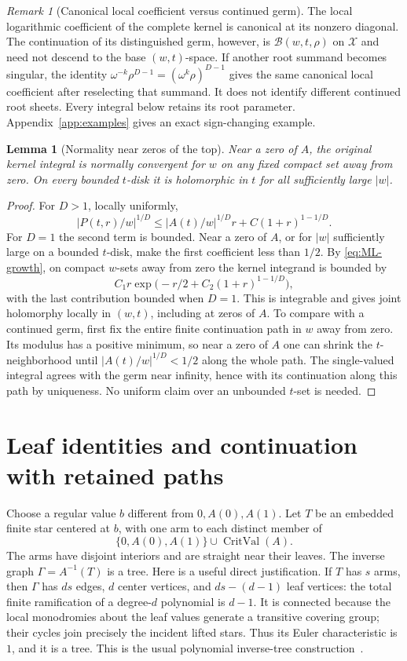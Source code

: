\documentclass[11pt]{article}
\numberwithin{equation}{section}
\newtheorem{lemma}[theorem]{Lemma}
\theoremstyle{definition}\newtheorem{definition}[theorem]{Definition}
\theoremstyle{remark}\newtheorem{remark}[theorem]{Remark}
\newcommand{\Crit}{\operatorname{CritVal}}
\begin{document}
\begin{remark}[Canonical local coefficient versus continued germ]\label{rem:B-sheets}
The local logarithmic coefficient of the complete kernel is canonical at
its nonzero diagonal. The continuation of its distinguished germ, however,
is $\mathscr B(w,t,\rho)$ on $\mathscr X$ and need not descend to the base
$(w,t)$-space. If another root summand becomes singular, the identity
$\omega^{-k}\rho^{D-1}=(\omega^k\rho)^{D-1}$ gives the same canonical
local coefficient after reselecting that summand. It does not identify
different continued root sheets. Every integral below retains its root
parameter. Appendix~\ref{app:examples} gives an exact sign-changing example.
\end{remark}

\begin{lemma}[Normality near zeros of the top]\label{lem:normality}
Near a zero of $A$, the original kernel integral is normally convergent
for $w$ on any fixed compact set away from zero. On every bounded $t$-disk
it is holomorphic in $t$ for all sufficiently large $|w|$.
\end{lemma}
\begin{proof}
For $D>1$, locally uniformly,
\[
 |P(t,r)/w|^{1/D}\le |A(t)/w|^{1/D}r+C(1+r)^{1-1/D}.
\]
For $D=1$ the second term is bounded. Near a zero of $A$, or for $|w|$
sufficiently large on a bounded $t$-disk, make the first coefficient
less than $1/2$. By \eqref{eq:ML-growth}, on compact $w$-sets away
from zero the kernel integrand is bounded by
\[
 C_1r\exp\bigl(-r/2+C_2(1+r)^{1-1/D}\bigr),
\]
with the last contribution bounded when $D=1$. This is integrable and
gives joint holomorphy locally in $(w,t)$, including at zeros of $A$.
To compare with a continued germ, first fix the entire finite
continuation path in $w$ away from zero. Its modulus has a positive
minimum, so near a zero of $A$ one can shrink the $t$-neighborhood until
$|A(t)/w|^{1/D}<1/2$ along the whole path. The single-valued integral
agrees with the germ near infinity, hence with its continuation along
this path by uniqueness. No uniform claim over an unbounded $t$-set is
needed.
\end{proof}

\section{Leaf identities and continuation with retained paths}\label{sec:transport}
Choose a regular value $b$ different from $0,A(0),A(1)$. Let $T$ be an
embedded finite star centered at $b$, with one arm to each distinct member
of
\[
 \{0,A(0),A(1)\}\cup\Crit(A).
\]
The arms have disjoint interiors and are straight near their leaves.
The inverse graph $\Gamma=A^{-1}(T)$ is a tree. Here is a useful direct
justification. If $T$ has $s$ arms, then $\Gamma$ has $ds$ edges, $d$
center vertices, and $ds-(d-1)$ leaf vertices: the total finite
ramification of a degree-$d$ polynomial is $d-1$. It is connected because
the local monodromies about the leaf values generate a transitive
covering group; their cycles join precisely the incident lifted stars.
Thus its Euler characteristic is $1$, and it is a tree. This is the usual
polynomial inverse-tree construction~\cite[Section~2.1]{PM}.
\end{document}
